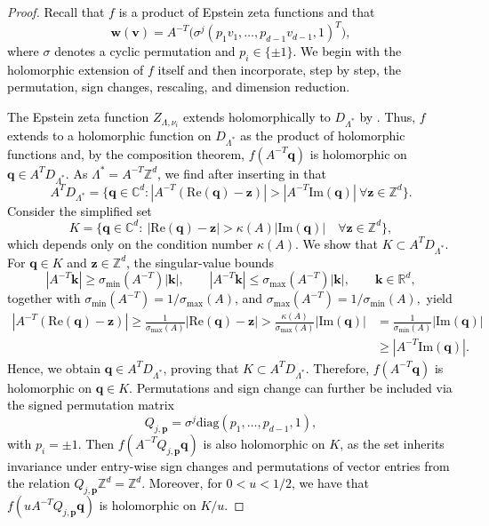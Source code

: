 \documentclass[10pt,a4paper]{amsart}
\renewcommand{\Im}[1]{\mathrm{Im}(#1)}
\renewcommand{\Re}[1]{\mathrm{Re}(#1)}
\newcommand{\new}[1]{{\textcolor{black}{#1}}}
\begin{document}
\begin{proof}
\new{Recall that \(f\) is a product of Epstein zeta functions and that
\[
\bm w(\bm v)
=
A^{-T}\bigl(\sigma^j(p_1v_1,\dots,p_{d-1}v_{d-1},1)^T\bigr),
\]
where \(\sigma\) denotes a cyclic permutation and \(p_i\in\{\pm1\}\). We begin with the holomorphic extension of \(f\) itself and then incorporate, step by step, the permutation, sign changes, rescaling, and dimension reduction.}

\new{The Epstein zeta function $Z_{\Lambda,\nu_i}$ extends holomorphically to $D_{\Lambda^*}$ by \Cref{holreg}. Thus, $f$ extends to a holomorphic function on $D_{\Lambda^*}$
as the product of holomorphic functions and,
by the composition theorem,
$f(A^{-T} \bm q)$ is holomorphic on 
$\bm q\in 
A^TD_{\Lambda^*}$. As $\Lambda^\ast=A^{-T} \mathds Z^d$, we find after inserting in \Cref{holreg} that
\[
A^T D_{\Lambda^*}=\{\bm q\in\mathds C^d:|A^{-T}(\Re{\bm q}-\bm z)|>|A^{-T}\Im{\bm q}|\ \forall \bm z\in \mathds Z^d\}.
\]}
\new{Consider the simplified set
\[
K
=
\{\bm q\in\mathds C^d:\ |\Re{\bm q}-\bm z|>\kappa(A)|\Im{\bm q}|
\quad \forall \bm z\in\mathds Z^d\},
\]
which depends only on the condition number \(\kappa(A)\). We show that $K\subset A^T D_{\Lambda^\ast}$.
For \(\bm q\in K\) and \(\bm z\in\mathds Z^d\), the singular-value bounds
\[
|A^{-T}\bm k|\ge \sigma_{\min}(A^{-T})|\bm k|,
\qquad
|A^{-T}\bm k|\le \sigma_{\max}(A^{-T})|\bm k|,
\qquad \bm k\in\mathds R^d,
\]
together with
$
\sigma_{\min}(A^{-T})=1/\sigma_{\max}(A)$, and
$
\sigma_{\max}(A^{-T})=1/\sigma_{\min}(A),
$
yield
\begin{align*}
|A^{-T}(\Re{\bm q}-\bm z)|
\ge \frac{1}{\sigma_{\max}(A)}|\Re{\bm q}-\bm z|
> \frac{\kappa(A)}{\sigma_{\max}(A)}|\Im{\bm q}|
&= \frac{1}{\sigma_{\min}(A)}|\Im{\bm q}|\\
&\ge |A^{-T}\Im{\bm q}|.
\end{align*}
Hence, we obtain \(\bm q\in A^T D_{\Lambda^\ast}\), proving that \(K\subset A^T D_{\Lambda^\ast}\). Therefore, \(f(A^{-T}\bm q)\) is holomorphic on \(\bm q\in K\).
Permutations and sign change can further be included via the signed permutation matrix \[Q_{j,\bm p}=\sigma^j \mathrm{diag}(p_1,\dots,p_{d-1},1),\] with $p_i= \pm 1$. Then $f(A^{-T} Q_{j,\bm p}\bm q)$ is also holomorphic on $K$, as the set inherits invariance under entry-wise sign changes and permutations of vector entries from the relation $Q_{j,\bm p}\mathds Z^d =\mathds Z^d$. Moreover, for $0<u<1/2$, we have that $f(u A^{-T} Q_{j,\bm p}\bm q)$ is holomorphic on $K/u$.}


\end{proof}
\end{document}
